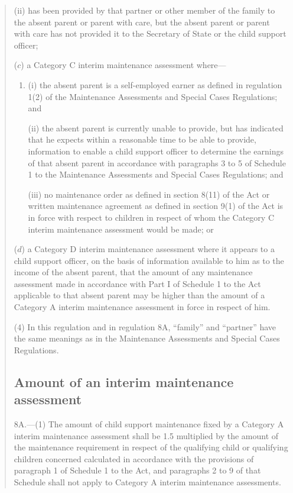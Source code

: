 \documentclass[12pt,a4paper]{article}
\begin{document}
\begin{quotation}
\begin{enumerate}
\begin{enumerate}
(ii) has been provided by that partner or other member of the family to the absent parent or parent with care, but the absent parent or parent with care has not provided it to the Secretary of State or the child support officer;
\end{enumerate}

($c$) a Category C interim maintenance assessment where—
\begin{enumerate}\item[]
(i) the absent parent is a self-employed earner as defined in regulation 1(2) of the Maintenance Assessments and Special Cases Regulations; and

(ii) the absent parent is currently unable to provide, but has indicated that he expects within a reasonable time to be able to provide, information to enable a child support officer to determine the earnings of that absent parent in accordance with paragraphs 3 to 5 of Schedule 1 to the Maintenance Assessments and Special Cases Regulations; and

(iii) no maintenance order as defined in section 8(11) of the Act or written maintenance agreement as defined in section 9(1) of the Act is in force with respect to children in respect of whom the Category C interim maintenance assessment would be made; or
\end{enumerate}

($d$) a Category D interim maintenance assessment where it appears to a child support officer, on the basis of information available to him as to the income of the absent parent, that the amount of any maintenance assessment made in accordance with Part I of Schedule 1 to the Act applicable to that absent parent may be higher than the amount of a Category A interim maintenance assessment in force in respect of him.
\end{enumerate}

(4) In this regulation and in regulation 8A, “family” and “partner” have the same meanings as in the Maintenance Assessments and Special Cases Regulations.

\subsection*{Amount of an interim maintenance assessment}

8A.—(1) The amount of child support maintenance fixed by a Category A interim maintenance assessment shall be 1.5 multiplied by the amount of the maintenance requirement in respect of the qualifying child or qualifying children concerned calculated in accordance with the provisions of paragraph 1 of Schedule 1 to the Act, and paragraphs 2 to 9 of that Schedule shall not apply to Category A interim maintenance assessments.


\end{quotation}
\end{document}
